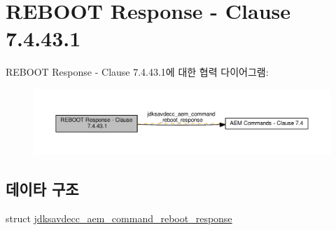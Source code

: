 \hypertarget{group__command__reboot__response}{}\section{R\+E\+B\+O\+OT Response -\/ Clause 7.4.43.1}
\label{group__command__reboot__response}
R\+E\+B\+O\+OT Response -\/ Clause 7.4.43.1에 대한 협력 다이어그램\+:
\nopagebreak
\begin{figure}[H]
\begin{center}
\leavevmode
\includegraphics[width=350pt]{group__command__reboot__response}
\end{center}
\end{figure}
\subsection*{데이타 구조}
\begin{DoxyCompactItemize}
\item 
struct \hyperlink{structjdksavdecc__aem__command__reboot__response}{jdksavdecc\+\_\+aem\+\_\+command\+\_\+reboot\+\_\+response}
\end{DoxyCompactItemize}
